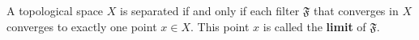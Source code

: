 A topological space $X$ is separated if and only if each filter $\mathfrak{F}$ that converges in $X$ converges to exactly one point $x \in X$. This point $x$ is called the \textbf{limit} of $\mathfrak{F}$.
